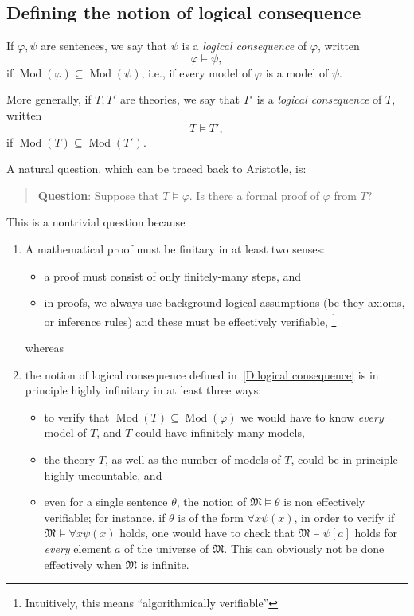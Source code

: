 \documentclass{scrartcl}
\DeclareMathOperator{\Mod}{Mod}
\renewcommand{\phi}{\varphi}
\newcommand{\FM}{\mathfrak{M}}
\begin{document}
\subsection{Defining the notion of logical consequence}
\label{S:logical consequence}

\begin{definition}
\label{D:logical consequence}
If $\phi,\psi$ are sentences, we say that $\psi$ is a \emph{logical consequence} of $\phi$, written 
\[
\phi\models\psi,
\]
if $\Mod(\phi)\subseteq \Mod(\psi)$, i.e., if every model of $\phi$ is a model of $\psi$.

More generally,  if $T,T'$ are theories, we say that $T'$ is a \emph{logical consequence} of $T$, written 
\[
T\models T',
\]
if $\Mod(T)\subseteq \Mod(T')$.
\end{definition}

A natural question, which can be traced back to Aristotle, is: 

\begin{quote}
\textbf{Question}: Suppose that $T\models\phi$. Is there a formal proof of $\phi$ from $T$? 
\end{quote}

This is a nontrivial question because

\begin{enumerate}
\item
A mathematical proof must be finitary in at least two senses: 
\begin{itemize}
\item
a proof must consist of only finitely-many steps, and
\item
in proofs, we always use background logical assumptions (be they axioms, or inference rules) and these must be effectively verifiable,%
\footnote{Intuitively, this means ``algorithmically verifiable''}
\end{itemize}

whereas

\item
the notion of logical consequence defined in~\ref{D:logical consequence}  is in principle highly infinitary in at least three ways: 
\begin{itemize}
\item
to  verify that $\Mod(T)\subseteq \Mod(\phi)$ we would have to know \emph{every} model of $T$, and  $T$ could have infinitely many models,
\item
the theory $T$, as well as the number of models of $T$, could be in principle highly uncountable, and
\item
even for a single sentence $\theta$, the notion of  $\FM\models \theta$  is non effectively verifiable; for instance, if $\theta$ is of the form $\forall x \psi(x)$, in order to verify if $\FM\models\forall x \psi(x)$ holds, one would have to check that $\FM\models \psi[a]$ holds for \emph{every} element $a$ of the universe of $\FM$. This can obviously not be done effectively when $\FM$ is infinite.
\end{itemize}
 
\end{enumerate}
\end{document}
